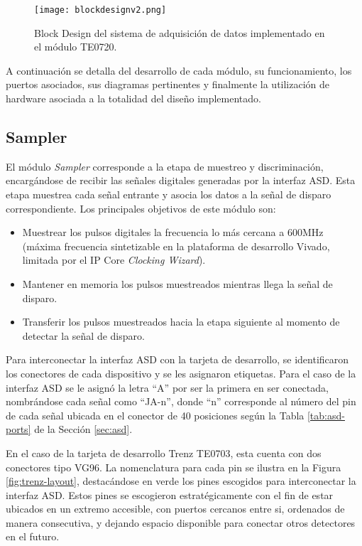 	\begin{figure}[H]
		\centering
		\texttt{[image: blockdesignv2.png]}
		\caption{Block Design del sistema de adquisición de datos implementado en el módulo TE0720.}
		\label{fig:blockdesign}
	\end{figure}
	
	A continuación se detalla del desarrollo de cada módulo, su funcionamiento, los puertos asociados, sus diagramas pertinentes y finalmente la utilización de hardware asociada a la totalidad del diseño implementado. %
	
	\subsection{Sampler}
	\label{sec:sampling}
	
	El módulo \textit{Sampler} corresponde a la etapa de muestreo y discriminación, encargándose de recibir las señales digitales generadas por la interfaz ASD. Esta etapa muestrea cada señal entrante y asocia los datos a la señal de disparo correspondiente. Los principales objetivos de este módulo son:
	
	\begin{itemize}
		\item Muestrear los pulsos digitales la frecuencia lo más cercana a 600MHz (máxima frecuencia sintetizable en la plataforma de desarrollo Vivado, limitada por el IP Core \textit{Clocking Wizard}\cite{Xilinx2021ClockingSuite}). %
		\item Mantener en memoria los pulsos muestreados mientras llega la señal de disparo.
		\item Transferir los pulsos muestreados hacia la etapa siguiente al momento de detectar la señal de disparo.
	\end{itemize}

	Para interconectar la interfaz ASD con la tarjeta de desarrollo, se identificaron los conectores de cada dispositivo y se les asignaron etiquetas. Para el caso de la interfaz ASD se le asignó la letra ``A'' por ser la primera en ser conectada, nombrándose cada señal como ``JA-n'', donde ``n'' corresponde al número del pin de cada señal ubicada en el conector de 40 posiciones según la Tabla \ref{tab:asd-ports} de la Sección \ref{sec:asd}.
	
	En el caso de la tarjeta de desarrollo Trenz TE0703, esta cuenta con dos conectores tipo VG96. La nomenclatura para cada pin se ilustra en la Figura \ref{fig:trenz-layout}, destacándose en verde los pines escogidos para interconectar la interfaz ASD. Estos pines se escogieron estratégicamente con el fin de estar ubicados en un extremo accesible, con puertos cercanos entre si, ordenados de manera consecutiva, y dejando espacio disponible para conectar otros detectores en el futuro.
	
